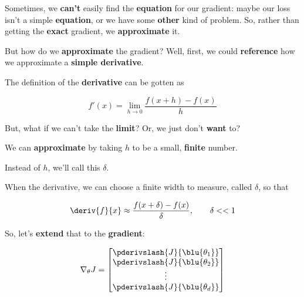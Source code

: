         Sometimes, we \textbf{can't} easily find the \textbf{equation} for our gradient: maybe our loss isn't a simple \textbf{equation}, or we have some \textbf{other} kind of problem. So, rather than getting the \textbf{exact} gradient, we \textbf{approximate} it.
        
        But how do we \textbf{approximate} the gradient? Well, first, we could \textbf{reference} how we approximate a \textbf{simple derivative}.
            
        The definition of the \textbf{derivative} can be gotten as 
        
        \begin{equation}
            f'(x) = \lim_{h \rightarrow 0} \frac{f(x+h)-f(x)}{h}
        \end{equation}
        
        But, what if we can't take the \textbf{limit}? Or, we just don't \textbf{want} to? 
        
        We can \textbf{approximate} by taking $h$ to be a small, \textbf{finite} number.
        
        Instead of $h$, we'll call this $\delta$.
        
        \begin{concept}
            When  the derivative, we can choose a  finite width to measure, called $\delta$, so that
            
            \begin{equation}
                \deriv{f}{x} \approx
                \frac{f(x+\delta)-f(x)}{\delta} , \qquad \delta << 1
            \end{equation}
        \end{concept}
        
        So, let's \textbf{extend} that to the \textbf{gradient}:
        
        \begin{equation}
            \nabla_\theta J 
            = 
            \begin{bmatrix}
                  \pderivslash{J}{ \blu{\theta_1} } \\ 
                  \pderivslash{J}{ \blu{\theta_2} } \\
                  \vdots \\
                  \pderivslash{J}{ \blu{\theta_d} } \\
            \end{bmatrix}
        \end{equation}
        
